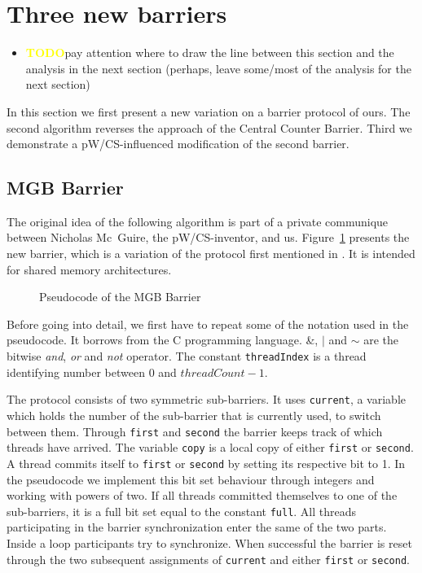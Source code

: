 \documentclass[a4paper, 10pt]{article}
\def \todo{\textbf{\textcolor{yellow}{TODO}}}
\begin{document}
\section{Three new barriers}
\label{sec:new}
\begin{itemize}
	\item \todo pay attention where to draw the line between this section and the analysis in the next section (perhaps, leave some/most of the analysis for the next section)
\end{itemize}
In this section we first present a new variation on a barrier protocol of ours. The second algorithm reverses the approach of the Central Counter Barrier. Third we demonstrate a pW/CS-influenced modification of the second barrier.
\subsection{MGB Barrier}
\label{ssec:new-mgb}
The original idea of the following algorithm is part of a private communique between Nicholas Mc~Guire, the pW/CS-inventor, and us. Figure~\ref{fig:pseudocode-mgb} presents the new barrier, which is a variation of the protocol first mentioned in \cite{bre13}. It is intended for shared memory architectures.

\begin{figure}[htbp]
	\centering
	
	\caption{Pseudocode of the MGB Barrier}
	\label{fig:pseudocode-mgb}
\end{figure}

Before going into detail, we first have to repeat some of the notation used in the pseudocode. It borrows from the C programming language. \&, $|$ and $\sim$ are the bitwise \emph{and}, \emph{or} and \emph{not} operator. The constant \texttt{threadIndex} is a thread identifying number between 0 and $\mathit{threadCount}-1$.

The protocol consists of two symmetric sub-barriers. It uses \texttt{current}, a variable which holds the number of the sub-barrier that is currently used, to switch between them.
Through \texttt{first} and \texttt{second} the barrier keeps track of which threads have arrived.
The variable \texttt{copy} is a local copy of either \texttt{first} or \texttt{second}.
A thread commits itself to \texttt{first} or \texttt{second} by setting its respective bit to 1. In the pseudocode we implement this bit set behaviour through integers and working with powers of two. If all threads committed themselves to one of the sub-barriers, it is a full bit set equal to the constant \texttt{full}.
All threads participating in the barrier synchronization enter the same of the two parts.
Inside a loop participants try to synchronize. When successful the barrier is reset through the two subsequent assignments of \texttt{current} and either \texttt{first} or \texttt{second}.
\end{document}
